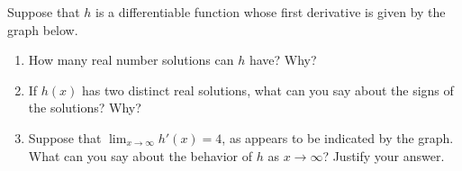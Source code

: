 \documentclass{ximera}
\begin{document}
\begin{exercise}
    Suppose that $h$ is a differentiable function whose first derivative is given by the graph below.
    \begin{image}
    \end{image}
    \begin{enumerate}
        \item How many real number solutions can $h$ have? Why? 
        \item If $h(x)$ has two distinct real solutions, what can you say about the signs of the solutions?  Why?
        \item Suppose that $\lim_{x\rightarrow \infty}h'(x)=4$, as appears to be indicated by the graph. What can you say about the behavior of $h$ as $x\rightarrow \infty$?  Justify your answer.
    \end{enumerate}
\end{exercise}
\end{document}
